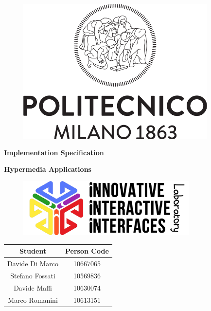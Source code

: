 \documentclass[11pt, letterpaper]{article}
\begin{document}
    \begin{titlepage}
        \begin{center}
        \vspace*{1cm}
            \begin{figure}
                \centering
                \includegraphics[width=10cm]{images/logos/Logo_Politecnico_Milano.png}
            \end{figure}
            
            \huge
            \textbf{Implementation Specification}

            \vspace{1cm}
        
            \Large
            \textbf{Hypermedia Applications}

            \vspace{1.5cm}

            \begin{figure}[H]
                \centering
                \includegraphics[width=9cm]{images/logos/i3lab.png}
            \end{figure}

            \vspace{2cm}

            \begin{tabular}{c|c}
                Student & Person Code\\
                \hline\hline
                Davide Di Marco & 10667065\\
                Stefano Fossati & 10569836\\
                Davide Maffi & 10630074\\
                Marco Romanini & 10613151
            \end{tabular}
            \large
            
        \end{center}
    \end{titlepage}
\end{document}

